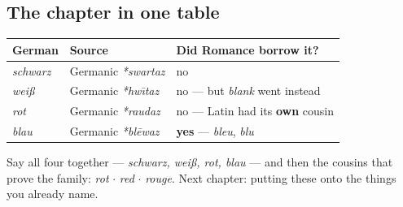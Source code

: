 \subsection*{The chapter in one table}

\begin{center}
\begin{tabular}{@{}lll@{}}
\toprule
German & Source & Did Romance borrow it? \\
\midrule
\emph{schwarz} & Germanic \emph{*swartaz} & no \\
\emph{wei\ss{}} & Germanic \emph{*hw\=\i taz} & no --- but \emph{blank} went
instead \\
\emph{rot} & Germanic \emph{*raudaz} & no --- Latin had its \textbf{own} cousin \\
\emph{blau} & Germanic \emph{*bl\=ewaz} & \textbf{yes} --- \emph{bleu},
\emph{blu} \\
\bottomrule
\end{tabular}
\end{center}

Say all four together --- \emph{schwarz, wei\ss{}, rot, blau} --- and then the
cousins that prove the family: \emph{rot} $\cdot$ \emph{red} $\cdot$
\emph{rouge}. Next chapter: putting these onto the things you already name.

